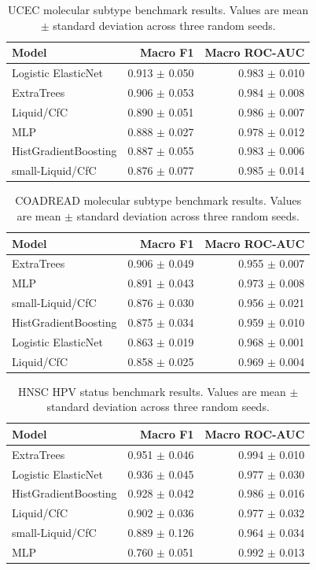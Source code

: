 \begin{table}[ht]
\centering
\caption{UCEC molecular subtype benchmark results. Values are mean $\pm$ standard deviation across three random seeds.}
\begin{tabular}{lrr}
\toprule
Model & Macro F1 & Macro ROC-AUC \\
\midrule
Logistic ElasticNet & 0.913 $\pm$ 0.050 & 0.983 $\pm$ 0.010 \\
ExtraTrees & 0.906 $\pm$ 0.053 & 0.984 $\pm$ 0.008 \\
Liquid/CfC & 0.890 $\pm$ 0.051 & 0.986 $\pm$ 0.007 \\
MLP & 0.888 $\pm$ 0.027 & 0.978 $\pm$ 0.012 \\
HistGradientBoosting & 0.887 $\pm$ 0.055 & 0.983 $\pm$ 0.006 \\
small-Liquid/CfC & 0.876 $\pm$ 0.077 & 0.985 $\pm$ 0.014 \\
\bottomrule
\end{tabular}
\label{tab:supp_ucec}
\end{table}

\begin{table}[ht]
\centering
\caption{COADREAD molecular subtype benchmark results. Values are mean $\pm$ standard deviation across three random seeds.}
\begin{tabular}{lrr}
\toprule
Model & Macro F1 & Macro ROC-AUC \\
\midrule
ExtraTrees & 0.906 $\pm$ 0.049 & 0.955 $\pm$ 0.007 \\
MLP & 0.891 $\pm$ 0.043 & 0.973 $\pm$ 0.008 \\
small-Liquid/CfC & 0.876 $\pm$ 0.030 & 0.956 $\pm$ 0.021 \\
HistGradientBoosting & 0.875 $\pm$ 0.034 & 0.959 $\pm$ 0.010 \\
Logistic ElasticNet & 0.863 $\pm$ 0.019 & 0.968 $\pm$ 0.001 \\
Liquid/CfC & 0.858 $\pm$ 0.025 & 0.969 $\pm$ 0.004 \\
\bottomrule
\end{tabular}
\label{tab:supp_coadread}
\end{table}

\begin{table}[ht]
\centering
\caption{HNSC HPV status benchmark results. Values are mean $\pm$ standard deviation across three random seeds.}
\begin{tabular}{lrr}
\toprule
Model & Macro F1 & Macro ROC-AUC \\
\midrule
ExtraTrees & 0.951 $\pm$ 0.046 & 0.994 $\pm$ 0.010 \\
Logistic ElasticNet & 0.936 $\pm$ 0.045 & 0.977 $\pm$ 0.030 \\
HistGradientBoosting & 0.928 $\pm$ 0.042 & 0.986 $\pm$ 0.016 \\
Liquid/CfC & 0.902 $\pm$ 0.036 & 0.977 $\pm$ 0.032 \\
small-Liquid/CfC & 0.889 $\pm$ 0.126 & 0.964 $\pm$ 0.034 \\
MLP & 0.760 $\pm$ 0.051 & 0.992 $\pm$ 0.013 \\
\bottomrule
\end{tabular}
\label{tab:supp_hnsc}
\end{table}

